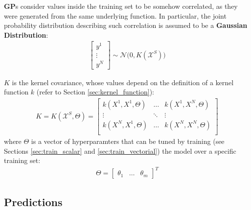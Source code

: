 \documentclass{article}
\begin{document}
\textbf{GP}s consider values inside the training set to be somehow correlated, as they were generated from the same underlying function.
In particular, the joint probability distribution describing such correlation is assumed to be a \textbf{Gaussian Distribution}:
\begin{eqnarray}
\begin{bmatrix} y^1 \\ \vdots \\ y^N \end{bmatrix} \sim \mathcal{N} 
\bigg (
0, K(\mathcal{X}^S)
\bigg ) 
\label{eq:y_joint_distr}
\end{eqnarray}

$K$ is the kernel covariance, whose values depend on the definition of a kernel function $k$ (refer to Section \ref{sec:kernel_function}):
\begin{eqnarray}
K = K(\mathcal{X}^S, \Theta) = \begin{bmatrix}
k(X^1, X^1, \Theta) & \hdots & k(X^1, X^N, \Theta) \\ 
\vdots & \ddots & \vdots \\ 
k(X^N, X^1, \Theta) & \hdots & k(X^N, X^N, \Theta) \\ 
\end{bmatrix}
\end{eqnarray}
where $\Theta$ is a vector of hyperparamters that can be tuned by training (see Sections \ref{sec:train_scalar} and \ref{sec:train_vectorial}) the model over a specific training set:
\begin{eqnarray}
\Theta = \begin{bmatrix} \theta_1 & \hdots & \theta_m \end{bmatrix} ^ T
\end{eqnarray}

\subsection{Predictions}
\label{sec:predictions_scalar}
\end{document}
